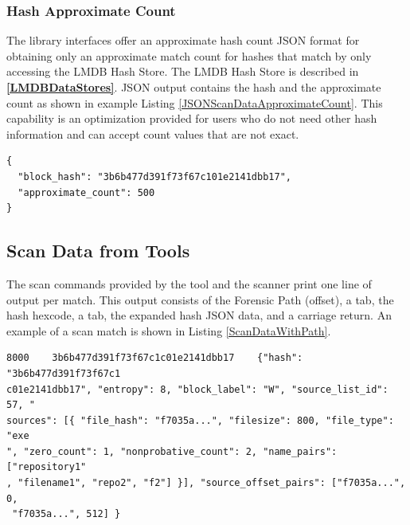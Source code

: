 \documentclass[11pt,fleqn]{article} %
\begin{document}
\subsubsection{Hash Approximate Count}
The \hdb library interfaces offer an approximate hash count JSON format for obtaining only an approximate match count for hashes that match by only accessing the LMDB Hash Store. The LMDB Hash Store is described in \textbf{\autoref{LMDBDataStores}}. JSON output contains the hash and the approximate count as shown in example Listing \ref{JSONScanDataApproximateCount}. This capability is an optimization provided for users who do not need other hash information and can accept count values that are not exact.

\lstset{style=customfile}
\begin{lstlisting}[float, caption={Example JSON block hash data approximate count output from a scan match, with line breaks added for readability}, label=JSONScanDataApproximateCount]
{
  "block_hash": "3b6b477d391f73f67c101e2141dbb17",
  "approximate_count": 500
}
\end{lstlisting}

\subsection{Scan Data from Tools}
The scan commands provided by the \hdb tool and the \bulk \hdb scanner print one line of output per match. This output consists of the Forensic Path (offset), a tab, the hash hexcode, a tab, the expanded hash JSON data, and a carriage return. An example of a scan match is shown in Listing \ref{ScanDataWithPath}.\\

\lstset{style=customfile}
\begin{lstlisting}[float, caption={Example output from a scan match}, label=ScanDataWithPath]
8000	3b6b477d391f73f67c1c01e2141dbb17    {"hash": "3b6b477d391f73f67c1
c01e2141dbb17", "entropy": 8, "block_label": "W", "source_list_id": 57, "
sources": [{ "file_hash": "f7035a...", "filesize": 800, "file_type": "exe
", "zero_count": 1, "nonprobative_count": 2, "name_pairs": ["repository1"
, "filename1", "repo2", "f2"] }], "source_offset_pairs": ["f7035a...", 0,
 "f7035a...", 512] }
\end{lstlisting}
\end{document}
